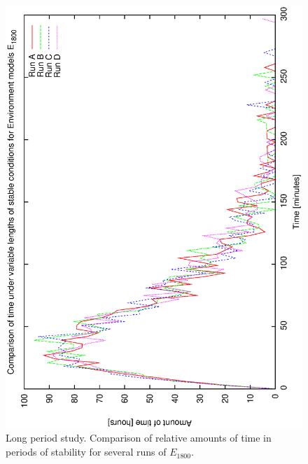 \begin{figure}[h]
\begin{center}
 \includegraphics[scale=0.5, angle=-90]{figures/e_18_comp.eps}
 \caption[Environmental scenario - comparison between runs of $E_{1800}$] 
   {Long period study. Comparison of relative amounts of time in periods of stability for several runs of $E_{1800}$.}
\label{fig:env_comp_18}
\end{center} 
\end{figure}

